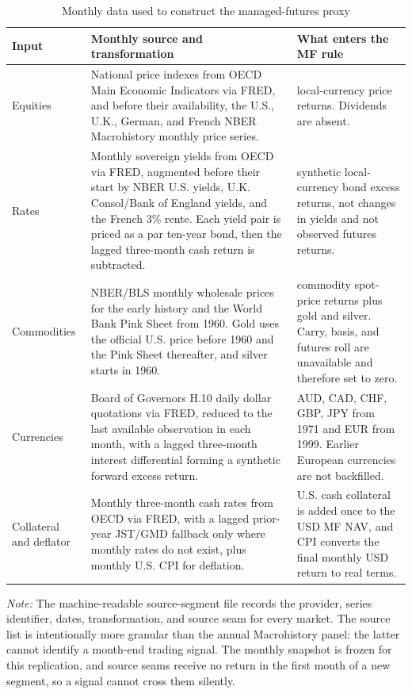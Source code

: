 \documentclass[11pt]{article}
\begin{document}
\begin{table}[H]
\centering
\caption{Monthly data used to construct the managed-futures proxy}
\label{tab:mf-monthly-sources}
\small
\begin{tabular}{>{\raggedright\arraybackslash}p{}>{\raggedright\arraybackslash}p{}>{\raggedright\arraybackslash}p{}}
\toprule
Input & Monthly source and transformation & What enters the MF rule \\
\midrule
Equities & National price indexes from OECD Main Economic Indicators via FRED, and before their availability, the U.S., U.K., German, and French NBER Macrohistory monthly price series. & 18 local-currency price returns. Dividends are absent. \\
Rates & Monthly sovereign yields from OECD via FRED, augmented before their start by NBER U.S. yields, U.K. Consol/Bank of England yields, and the French 3\% rente. Each yield pair is priced as a par ten-year bond, then the lagged three-month cash return is subtracted. & 18 synthetic local-currency bond excess returns, not changes in yields and not observed futures returns. \\
Commodities & NBER/BLS monthly wholesale prices for the early history and the World Bank Pink Sheet from 1960. Gold uses the official U.S. price before 1960 and the Pink Sheet thereafter, and silver starts in 1960. & 19 commodity spot-price returns plus gold and silver. Carry, basis, and futures roll are unavailable and therefore set to zero. \\
Currencies & Board of Governors H.10 daily dollar quotations via FRED, reduced to the last available observation in each month, with a lagged three-month interest differential forming a synthetic forward excess return. & AUD, CAD, CHF, GBP, JPY from 1971 and EUR from 1999. Earlier European currencies are not backfilled. \\
Collateral and deflator & Monthly three-month cash rates from OECD via FRED, with a lagged prior-year JST/GMD fallback only where monthly rates do not exist, plus monthly U.S. CPI for deflation. & U.S. cash collateral is added once to the USD MF NAV, and CPI converts the final monthly USD return to real terms. \\
\bottomrule
\end{tabular}
\begin{minipage}{0.94\textwidth}\footnotesize
\textit{Note:} The machine-readable source-segment file records the provider,
series identifier, dates, transformation, and source seam for every market.
The source list is intentionally more granular than the annual Macrohistory
panel: the latter cannot identify a month-end trading signal. The monthly
snapshot is frozen for this replication, and source seams receive no return in the
first month of a new segment, so a signal cannot cross them silently.
\end{minipage}
\end{table}
\end{document}
